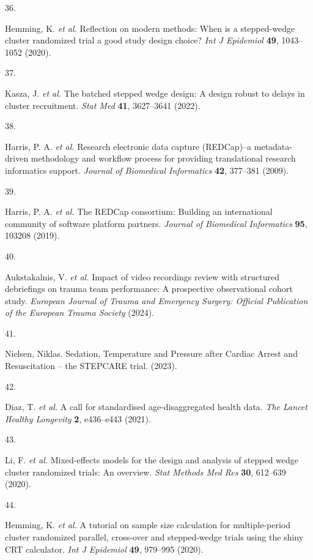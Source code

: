 \documentclass[
]{scrartcl}
\newlength{\cslhangindent}
\newlength{\csllabelwidth}
\newenvironment{CSLReferences}[2] %
 {\begin{list}{}{%
  \setlength{\itemindent}{0pt}
  \setlength{\leftmargin}{0pt}
  \setlength{\parsep}{0pt}
  \ifodd #1
   \setlength{\leftmargin}{\cslhangindent}
   \setlength{\itemindent}{-1\cslhangindent}
  \fi
  \setlength{\itemsep}{#2\baselineskip}}}
 {\end{list}}
\newcommand{\CSLLeftMargin}[1]{\parbox[t]{\csllabelwidth}{\strut#1\strut}}
\newcommand{\CSLRightInline}[1]{\parbox[t]{\linewidth - \csllabelwidth}{\strut#1\strut}}
\begin{document}
\begin{CSLReferences}{0}{0}
\CSLLeftMargin{36. }%
\CSLRightInline{Hemming, K. \emph{et al.} Reflection on modern methods:
When is a stepped-wedge cluster randomized trial a good study design
choice? \emph{Int J Epidemiol} \textbf{49}, 1043--1052 (2020).}

\CSLLeftMargin{37. }%
\CSLRightInline{Kasza, J. \emph{et al.} The batched stepped wedge
design: A design robust to delays in cluster recruitment. \emph{Stat
Med} \textbf{41}, 3627--3641 (2022).}

\CSLLeftMargin{38. }%
\CSLRightInline{Harris, P. A. \emph{et al.} Research electronic data
capture ({REDCap})--a metadata-driven methodology and workflow process
for providing translational research informatics support. \emph{Journal
of Biomedical Informatics} \textbf{42}, 377--381 (2009).}

\CSLLeftMargin{39. }%
\CSLRightInline{Harris, P. A. \emph{et al.} The {REDCap} consortium:
{Building} an international community of software platform partners.
\emph{Journal of Biomedical Informatics} \textbf{95}, 103208 (2019).}

\CSLLeftMargin{40. }%
\CSLRightInline{Aukstakalnis, V. \emph{et al.} Impact of video
recordings review with structured debriefings on trauma team
performance: A prospective observational cohort study. \emph{European
Journal of Trauma and Emergency Surgery: Official Publication of the
European Trauma Society} (2024).}

\CSLLeftMargin{41. }%
\CSLRightInline{Nielsen, Niklas. Sedation, {Temperature} and {Pressure}
after {Cardiac} {Arrest} and {Resuscitation} -- the {STEPCARE} trial.
(2023).}

\CSLLeftMargin{42. }%
\CSLRightInline{Diaz, T. \emph{et al.} A call for standardised
age-disaggregated health data. \emph{The Lancet Healthy Longevity}
\textbf{2}, e436--e443 (2021).}

\CSLLeftMargin{43. }%
\CSLRightInline{Li, F. \emph{et al.} Mixed-effects models for the design
and analysis of stepped wedge cluster randomized trials: An overview.
\emph{Stat Methods Med Res} \textbf{30}, 612--639 (2020).}

\CSLLeftMargin{44. }%
\CSLRightInline{Hemming, K. \emph{et al.} A tutorial on sample size
calculation for multiple-period cluster randomized parallel, cross-over
and stepped-wedge trials using the shiny CRT calculator. \emph{Int J
Epidemiol} \textbf{49}, 979--995 (2020).}


\end{CSLReferences}
\end{document}
